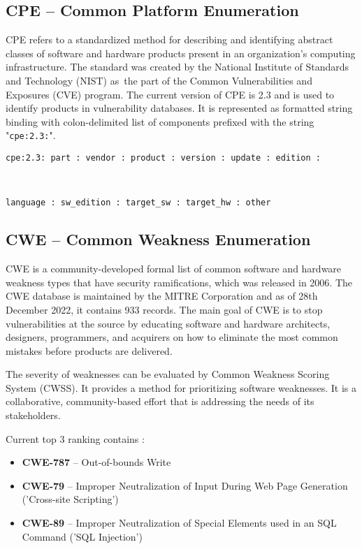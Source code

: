   \subsection*{CPE -- Common Platform Enumeration}
    CPE refers to a standardized method for describing and identifying abstract classes of software
    and hardware products present in an organization's computing infrastructure. The standard was created
    by the National Institute of Standards and Technology (NIST) as~the part of the Common Vulnerabilities
    and Exposures (CVE) program. The current version of CPE is 2.3 and is used to identify products
    in vulnerability databases. It is represented as formatted string binding with colon-delimited
    list of components prefixed with the string "\texttt{cpe:2.3:}". \cite{CPEnaming}\\
      \centerline{\texttt{cpe:2.3: part : vendor : product : version : update : edition :}}\\
      \centerline{\texttt{language : sw\_edition : target\_sw : target\_hw : other}}

  \subsection*{CWE -- Common Weakness Enumeration}
    CWE is a community-developed formal list of common software and hardware weakness types that
    have security ramifications, which was released in 2006. The CWE database is maintained by the MITRE Corporation
    and as of 28th December 2022, it contains 933 records. The main goal of CWE is to stop vulnerabilities
    at the source by educating software and hardware architects, designers, programmers, and acquirers
    on how to eliminate the most common mistakes before products are delivered. \cite{CWE}

    The severity of weaknesses can be evaluated by Common Weakness Scoring System (CWSS). It provides a method
    for prioritizing software weaknesses. It is a collaborative, community-based effort that is addressing
    the needs of its stakeholders. \cite{CWSS}

    Current top 3 ranking contains \cite{CWEtop25}:
    \begin{itemize}
      \item \textbf{CWE-787} -- Out-of-bounds Write
      \item \textbf{CWE-79} -- Improper Neutralization of Input During Web Page Generation ('Cross-site Scripting')
      \item \textbf{CWE-89} -- Improper Neutralization of Special Elements used in an SQL Command ('SQL Injection')
    \end{itemize}

